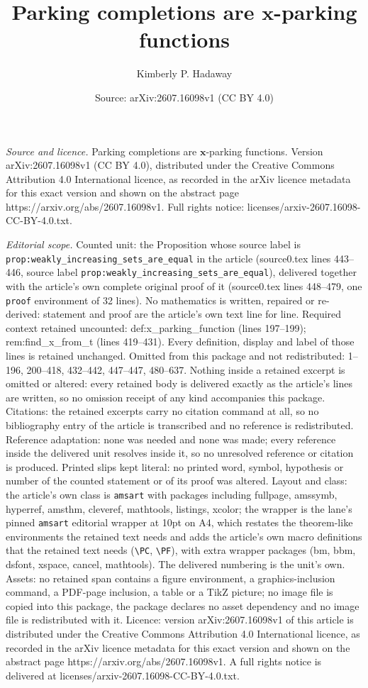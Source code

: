 \documentclass[10pt,a4paper]{amsart}
\title[Parking completions are $\mathbf{x}$-parking functions]{Parking completions are $\mathbf{x}$-parking functions}
\author{Kimberly P. Hadaway}
\date{Source: arXiv:2607.16098v1 (CC BY 4.0)}
\begin{document}
\maketitle

\noindent\emph{Source and licence.} Parking completions are $\mathbf{x}$-parking functions. Version arXiv:2607.16098v1 (CC BY 4.0), distributed under the Creative Commons Attribution 4.0 International licence, as recorded in the arXiv licence metadata for this exact version and shown on the abstract page https://arxiv.org/abs/2607.16098v1. Full rights notice: licenses/arxiv-2607.16098-CC-BY-4.0.txt.\par\smallskip

\noindent\textit{Editorial scope.} Counted unit: the Proposition whose source label is \texttt{prop:weakly\_increasing\_sets\_are\_equal} in the article (source0.tex lines 443--446, source label \texttt{prop:weakly\_increasing\_sets\_are\_equal}), delivered together with the article's own complete original proof of it (source0.tex lines 448--479, one \texttt{proof} environment of 32 lines). No mathematics is written, repaired or re-derived: statement and proof are the article's own text line for line. Required context retained uncounted: def:x\_parking\_function (lines 197--199); rem:find\_x\_from\_t (lines 419--431). Every definition, display and label of those lines is retained unchanged. Omitted from this package and not redistributed: 1--196, 200--418, 432--442, 447--447, 480--637. Nothing inside a retained excerpt is omitted or altered: every retained body is delivered exactly as the article's lines are written, so no omission receipt of any kind accompanies this package. Citations: the retained excerpts carry no citation command at all, so no bibliography entry of the article is transcribed and no reference is redistributed. Reference adaptation: none was needed and none was made; every reference inside the delivered unit resolves inside it, so no unresolved reference or citation is produced. Printed slips kept literal: no printed word, symbol, hypothesis or number of the counted statement or of its proof was altered. Layout and class: the article's own class is \texttt{amsart} with packages including fullpage, amssymb, hyperref, amsthm, cleveref, mathtools, listings, xcolor; the wrapper is the lane's pinned \texttt{amsart} editorial wrapper at 10pt on A4, which restates the theorem-like environments the retained text needs and adds the article's own macro definitions that the retained text needs (\texttt{\textbackslash PC}, \texttt{\textbackslash PF}), with extra wrapper packages (bm, bbm, dsfont, xspace, cancel, mathtools). The delivered numbering is the unit's own. Assets: no retained span contains a figure environment, a graphics-inclusion command, a PDF-page inclusion, a table or a TikZ picture; no image file is copied into this package, the package declares no asset dependency and no image file is redistributed with it. Licence: version arXiv:2607.16098v1 of this article is distributed under the Creative Commons Attribution 4.0 International licence, as recorded in the arXiv licence metadata for this exact version and shown on the abstract page https://arxiv.org/abs/2607.16098v1. A full rights notice is delivered at licenses/arxiv-2607.16098-CC-BY-4.0.txt. 
\end{document}
